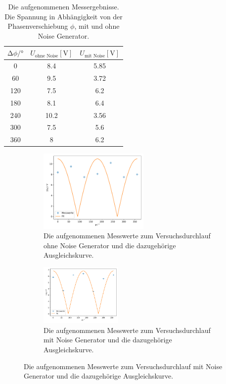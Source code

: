 \begin{table} \label{tab:data_ohne_mit}
  \centering
  \caption{Die aufgenommenen Messergebnisse. Die Spannung in Abhängigkeit von der Phasenverschiebung $\phi$, mit und ohne Noise Generator. } 
  \begin{tabular}{c c c}
    \toprule
    $\increment \phi /°$ & $U_\text{ohne Noise} [\si{\volt}]$ & $U_\text{mit Noise} [\si{\volt}]$ \\
    \midrule
    0    &   8.4   &  5.85  \\
    60   &   9.5   &  3.72  \\
    120  &   7.5   &  6.2   \\
    180  &   8.1   &  6.4   \\
    240  &   10.2  &  3.56  \\
    300  &   7.5   &  5.6   \\
    360  &   8     &  6.2   \\
    \bottomrule
  \end{tabular}
\end{table}

\begin{figure} \label{fig:versuch_1_cosinus}
  \begin{subfigure}{0.56\textwidth}
      \centering
      \includegraphics[height=4cm]{content/abbildungen/phasen_sonia.pdf}
      \caption{Die aufgenommenen Messwerte zum Versuchsdurchlauf ohne Noise Generator und die dazugehörige Ausgleichskurve.}
      \label{fig:ohne_noise}
  \end{subfigure}
\hfill
  \begin{subfigure}{0.40\textwidth}
      \centering
      \includegraphics[height=3cm]{content/abbildungen/phasen_noise_sonia.pdf}
      \caption{Die aufgenommenen Messwerte zum Versuchsdurchlauf mit Noise Generator und die dazugehörige Ausgleichskurve.}
      \label{fig:mit_noise}
  \end{subfigure}
\end{figure}

